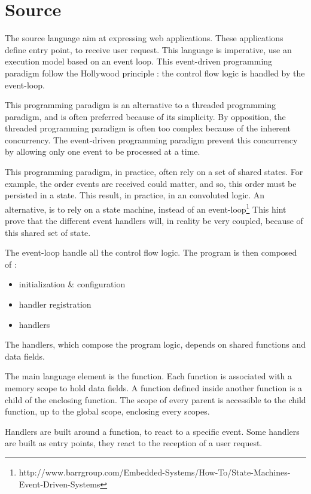 \section{Source}

The source language aim at expressing web applications.
These applications define entry point, to receive user request.
This language is imperative, use an execution model based on an event loop.
This event-driven programming paradigm follow the Hollywood principle : the control flow logic is handled by the event-loop.

This programming paradigm is an alternative to a threaded programming paradigm, and is often preferred because of its simplicity.
By opposition, the threaded programming paradigm is often too complex because of the inherent concurrency.
The event-driven programming paradigm prevent this concurrency by allowing only one event to be processed at a time.

This programming paradigm, in practice, often rely on a set of shared states.
For example, the order events are received could matter, and so, this order must be persisted in a state.
This result, in practice, in an convoluted logic.
An alternative, is to rely on a state machine, instead of an event-loop\footnote{\raggedright http://www.barrgroup.com/Embedded-Systems/How-To/State-Machines-Event-Driven-Systems}
This hint prove that the different event handlers will, in reality be very coupled, because of this shared set of state.


The event-loop handle all the control flow logic.
The program is then composed of :
\begin{itemize}
  \item initialization \& configuration
  \item handler registration
  \item handlers
\end{itemize}

The handlers, which compose the program logic, depends on shared functions and data fields.



The main language element is the function.
Each function is associated with a memory scope to hold data fields.
A function defined inside another function is a child of the enclosing function.
The scope of every parent is accessible to the child function, up to the global scope, enclosing every scopes.

Handlers are built around a function, to react to a specific event.
Some handlers are built as entry points, they react to the reception of a user request.

